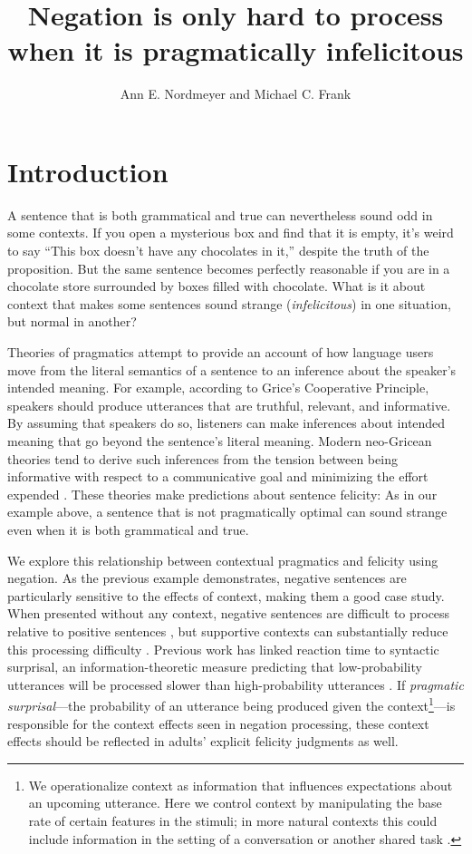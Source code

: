 \documentclass[man, noapacite]{apa2}
\title{Negation is only hard to process when it is pragmatically infelicitous}
\author{Ann E. Nordmeyer and Michael C. Frank}
\affiliation{Department of Psychology, Stanford University \\ 
Corresponding author: Ann E. Nordmeyer \\
Department of Psychology \\
Stanford University \\
Building 420 (Jordan Hall) \\
450 Serra Mall \\
Stanford, CA 94305 \\
Phone: 650-721-9270 \\
Email: anordmey@stanford.edu}
\begin{document}
\maketitle


\section{Introduction}

A sentence that is both grammatical and true can nevertheless sound odd in some contexts. If you open a mysterious box and find that it is empty, it's weird to say ``This box doesn't have any chocolates in it,'' despite the truth of the proposition. But the same sentence becomes perfectly reasonable if you are in a chocolate store surrounded by boxes filled with chocolate.  What is it about context that makes some sentences sound strange (\emph{infelicitous}) in one situation, but normal in another?

Theories of pragmatics attempt to provide an account of how language users move from the literal semantics of a sentence to an inference about the speaker's intended meaning. For example, according to Grice's \citeyear{grice1975} Cooperative Principle, speakers should produce utterances that are truthful, relevant, and informative.  By assuming that speakers do so, listeners can make inferences about intended meaning that go beyond the sentence's literal meaning. Modern neo-Gricean theories tend to derive such inferences from the tension between being informative with respect to a communicative goal and minimizing the effort expended \cite{horn1984,levinson2000,frank2012}. These theories make predictions about sentence felicity: As in our example above, a sentence that is not pragmatically optimal can sound strange even when it is both grammatical and true.

We explore this relationship between contextual pragmatics and felicity using negation. As the previous example demonstrates, negative sentences are particularly sensitive to the effects of context, making them a good case study.  When presented without any context, negative sentences are difficult to process relative to positive sentences \cite{hclark1972, carpenter1975, just1971, just1976}, but supportive contexts can substantially reduce this processing difficulty \cite{wason1965, glenberg1999, ludtke2006, nieuwland2008, dale2011, nordmeyer2014}.   Previous work has linked reaction time to syntactic surprisal, an information-theoretic measure predicting that low-probability utterances will be processed slower than high-probability utterances \cite{levy2008}.  If \emph{pragmatic surprisal}---the probability of an utterance being produced given the context\footnote{We operationalize context as information that influences expectations about an upcoming utterance.  Here we control context by manipulating the base rate of certain features in the stimuli; in more natural contexts this could include information in the setting of a conversation or another shared task  .}---is responsible for the context effects seen in negation processing, these context effects should be reflected in adults' explicit felicity judgments as well.   
\end{document}
